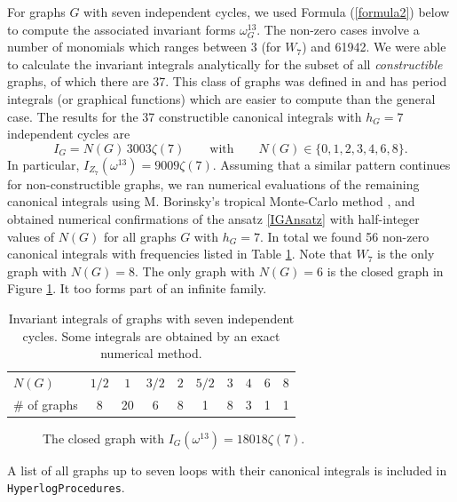 \documentclass[10pt]{amsart}
\theoremstyle{plain}
\newcommand{\0}{\color{blue}{\mathsf{0}}}
\begin{document}
For graphs $G$ with seven independent cycles, we used Formula  (\ref{formula2})   below  to compute the  associated invariant forms $\omega^{13}_G$. The non-zero cases involve a number of monomials which ranges between 3 (for  $W_7$)   and 61942.
We were able to calculate the invariant integrals analytically for the subset  of all {\em constructible} graphs, of  which there are 37. This class of graphs was defined in  \cite{schnetz2014graphical, BorinskySchnetz} and has period integrals (or graphical functions) which are easier to compute than the general case. 
The results for the 37 constructible canonical integrals with $h_G=7$ independent cycles are
\begin{equation} \label{IGAnsatz}
I_G = N(G)\,3003\zeta(7)\qquad\text{with}\qquad N(G)\in\{0,1,2,3,4,6,8\}.
\end{equation}
In particular,
$
I_{Z_7}(\omega^{13})=9009\zeta(7).
$
Assuming that a similar pattern continues  for non-constructible graphs, we ran numerical evaluations of the remaining canonical  integrals using
M. Borinsky's tropical Monte-Carlo method \cite{BorinskyTMCQ}, and  obtained numerical confirmations of the
ansatz \eqref{IGAnsatz} with half-integer values of  $N(G)$ for all graphs $G$ with $h_G=7.$
In total we found 56 non-zero canonical integrals  with frequencies listed in Table \ref{tabfreq}.
Note that $W_7$ is the only graph with $N(G)=8$. The only graph with $N(G)=6$ is the closed graph in Figure \ref{fig1}. It too forms part of an infinite family. 

\begin{table}[h]
\begin{center}
\begin{tabular}{l|ccccccccc}
$N(G)$&$1/2$&$1$&$3/2$&$2$&$5/2$&$3$&$4$&$6$&$8$\\
\# of graphs&8&20&6&8&1&8&3&1&1
\end{tabular}
\end{center}
\caption{Invariant integrals of graphs with seven independent cycles. Some integrals are obtained by an exact numerical method.}
\label{tabfreq}
\end{table}

\begin{figure}[ht]
\begin{center}
\end{center}
\caption{The closed graph with $I_G(\omega^{13})=18018\zeta(7)$.}
\label{fig1}
\end{figure}
A list of all graphs up to seven loops with their canonical integrals is included in {\tt HyperlogProcedures}.
\end{document}
